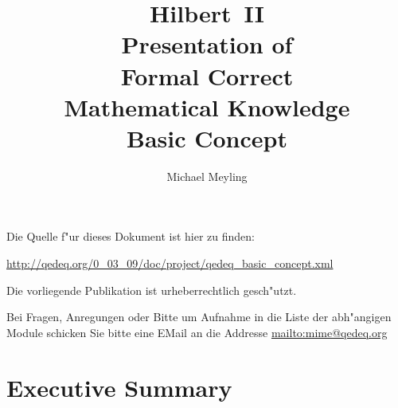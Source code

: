 \documentclass[a4paper,german,10pt,twoside]{book}
\title{\textbf{Hilbert~II} \\
\vspace*{1cm} 
Presentation of \\ 
Formal Correct \\
Mathematical Knowledge \\
\vspace*{1cm} Basic Concept}
\author{
Michael Meyling
}
\theoremstyle{definition}
\theoremstyle{remark}
\begin{document}
\maketitle

\setlength{\parskip}{5pt plus 2pt minus 1pt}
\mbox{}
\vfill

\par
Die Quelle f{"ur} dieses Dokument ist hier zu finden:
\par
\url{http://qedeq.org/0_03_09/doc/project/qedeq_basic_concept.xml}

\par
Die vorliegende Publikation ist urheberrechtlich gesch{"u}tzt.
\par
Bei Fragen, Anregungen oder Bitte um Aufnahme in die Liste der abh{"a}ngigen Module schicken Sie bitte eine EMail an die Addresse \url{mailto:mime@qedeq.org}

\setlength{\parskip}{0pt}
\tableofcontents

\setlength{\parskip}{5pt plus 2pt minus 1pt}

\chapter*{Executive Summary} \label{chapter0} \hypertarget{chapter0}{}
\end{document}

